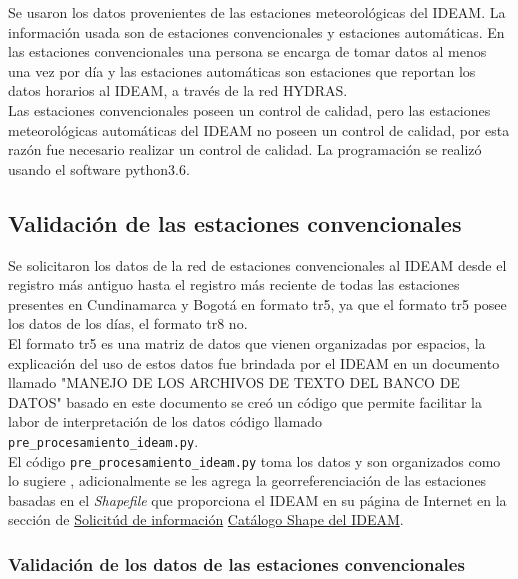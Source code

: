 \documentclass[11pt]{article}
\begin{document}
Se usaron los datos provenientes de las estaciones meteorológicas del IDEAM. La información usada son de estaciones convencionales y estaciones automáticas. En las estaciones convencionales una persona se encarga de tomar datos al menos una vez por día y las estaciones automáticas son estaciones que reportan los datos horarios al IDEAM, a través de la red HYDRAS.\\

Las estaciones convencionales poseen un control de calidad, pero las estaciones meteorológicas automáticas del IDEAM no poseen un control de calidad, por esta razón fue necesario realizar un control de calidad. La programación se realizó usando el software python3.6.

\subsection{Validación de las estaciones convencionales}

Se solicitaron los datos de la red de estaciones convencionales al IDEAM desde el registro más antiguo hasta el registro más reciente de todas las estaciones presentes en Cundinamarca y Bogotá en formato tr5, ya que el formato tr5 posee los datos de los días, el formato tr8 no.\\

El formato tr5 es una matriz de datos que vienen organizadas por espacios, la explicación del uso de estos datos fue brindada por el IDEAM en un documento llamado "MANEJO DE LOS ARCHIVOS DE TEXTO DEL BANCO DE DATOS" \citep{pedraza2015} basado en este documento se creó un código que permite facilitar la labor de interpretación de los datos código llamado \texttt{pre\_procesamiento\_ideam.py}.\\

El código \texttt{pre\_procesamiento\_ideam.py} toma los datos y son organizados como lo sugiere \citet{pedraza2015}, adicionalmente se les agrega la georreferenciación de las estaciones basadas en el \textit{Shapefile} que proporciona el IDEAM en su página de Internet en la sección de \textcolor{blue}{ \href{http://www.ideam.gov.co/solicitud-de-informacion}{Solicitúd de información}} \textcolor{blue}{ \href{institucional.ideam.gov.co/jsp/info/institucional/publicaciones/CATALOGO_ESTACIONES_IDEAM_V10_AGOSTO2017.zip}{Catálogo Shape del IDEAM}}.\\


\subsubsection{Validación de los datos de las estaciones convencionales}
\end{document}
